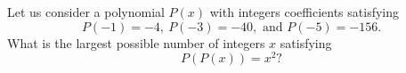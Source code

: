 Let us consider a polynomial $P(x)$ with integers coefficients satisfying$$P(-1)=-4,\ P(-3)=-40,\text{ and } P(-5)=-156.$$What is the largest possible number of integers $x$ satisfying$$P(P(x))=x^2?$$